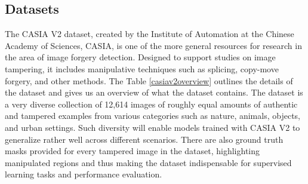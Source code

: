 \documentclass{ieeeaccess}
\begin{document}
\subsection{Datasets}
	The CASIA V2 dataset, created by the Institute of Automation at the Chinese Academy of Sciences, CASIA, is one of the more general resources for research in the area of image forgery detection. Designed to support studies on image tampering, it includes manipulative techniques such as splicing, copy-move forgery, and other methods. The Table \ref{casiav2overview} outlines the details of the dataset and gives us an overview of what the dataset contains. The dataset is a very diverse collection of 12,614 images of roughly equal amounts of authentic and tampered examples from various categories such as nature, animals, objects, and urban settings. Such diversity will enable models trained with CASIA V2 to generalize rather well across different scenarios. There are also ground truth masks provided for every tampered image in the dataset, highlighting manipulated regions and thus making the dataset indispensable for supervised learning tasks and performance evaluation.
\end{document}
